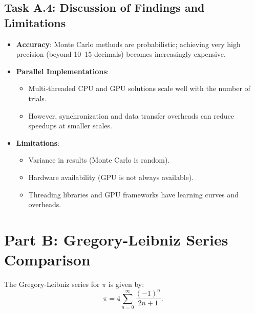 \documentclass[12pt]{article}
\begin{document}
\subsection{Task A.4: Discussion of Findings and Limitations}
\begin{itemize}
    \item \textbf{Accuracy}: Monte Carlo methods are probabilistic; achieving very high
          precision (beyond 10--15 decimals) becomes increasingly expensive.
    \item \textbf{Parallel Implementations}:
          \begin{itemize}
              \item Multi-threaded CPU and GPU solutions scale well with the number of trials.
              \item However, synchronization and data transfer overheads can reduce speedups at
                    smaller scales.
          \end{itemize}
    \item \textbf{Limitations}:
          \begin{itemize}
              \item Variance in results (Monte Carlo is random).
              \item Hardware availability (GPU is not always available).
              \item Threading libraries and GPU frameworks have learning curves and overheads.
          \end{itemize}
\end{itemize}

\section{Part B: Gregory-Leibniz Series Comparison}
The Gregory-Leibniz series for \(\pi\) is given by:
\[
    \pi = 4 \sum_{n=0}^{\infty} \frac{(-1)^n}{2n + 1}.
\]
\end{document}
